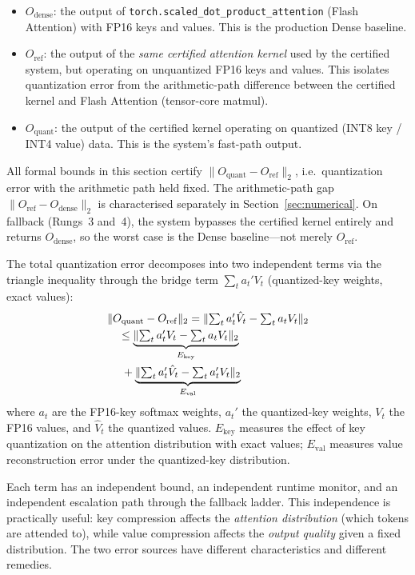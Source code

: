 \documentclass[10pt,twocolumn,a4paper]{article}
\theoremstyle{definition}
\theoremstyle{remark}
\newcommand{\norm}[1]{\lVert #1 \rVert}
\newcommand{\torchsdpa}{\texttt{torch.scaled\_\hspace{0pt}dot\_\hspace{0pt}product\_\hspace{0pt}attention}}
\begin{document}
\begin{itemize}[leftmargin=2em,itemsep=2pt]
\item $O_{\mathrm{dense}}$: the output of \torchsdpa{} (Flash Attention) with FP16 keys and values.  This is the production Dense baseline.
\item $O_{\mathrm{ref}}$: the output of the \emph{same certified attention kernel} used by the certified system, but operating on unquantized FP16 keys and values.  This isolates quantization error from the arithmetic-path difference between the certified kernel and Flash Attention (tensor-core matmul).
\item $O_{\mathrm{quant}}$: the output of the certified kernel operating on quantized (INT8 key / INT4 value) data.  This is the system's fast-path output.
\end{itemize}

All formal bounds in this section certify $\norm{O_{\mathrm{quant}} - O_{\mathrm{ref}}}_2$, i.e.\ quantization error with the arithmetic path held fixed.  The arithmetic-path gap $\norm{O_{\mathrm{ref}} - O_{\mathrm{dense}}}_2$ is characterised separately in Section~\ref{sec:numerical}.  On fallback (Rungs~3 and~4), the system bypasses the certified kernel entirely and returns $O_{\mathrm{dense}}$, so the worst case is the Dense baseline---not merely $O_{\mathrm{ref}}$.

The total quantization error decomposes into two independent terms via the triangle inequality through the bridge term $\sum_t a_t' V_t$ (quantized-key weights, exact values):
\begin{align}
\label{eq:decomp}
  &\norm{O_{\mathrm{quant}} - O_{\mathrm{ref}}}_2
  = \norm{\textstyle\sum_t a_t' \hat{V}_t - \sum_t a_t V_t}_2 \notag \\
  &\quad\leq \underbrace{\norm{\textstyle\sum_t a_t' V_t - \sum_t a_t V_t}_2}_{E_{\mathrm{key}}} \notag \\
  &\quad\;+ \underbrace{\norm{\textstyle\sum_t a_t' \hat{V}_t - \sum_t a_t' V_t}_2}_{E_{\mathrm{val}}}
\end{align}
where $a_t$ are the FP16-key softmax weights, $a_t'$ the quantized-key weights, $V_t$ the FP16 values, and $\hat{V}_t$ the quantized values.  $E_{\mathrm{key}}$ measures the effect of key quantization on the attention distribution with exact values; $E_{\mathrm{val}}$ measures value reconstruction error under the quantized-key distribution.

Each term has an independent bound, an independent runtime monitor, and an independent escalation path through the fallback ladder.  This independence is practically useful: key compression affects the \emph{attention distribution} (which tokens are attended to), while value compression affects the \emph{output quality} given a fixed distribution.  The two error sources have different characteristics and different remedies.
\end{document}
